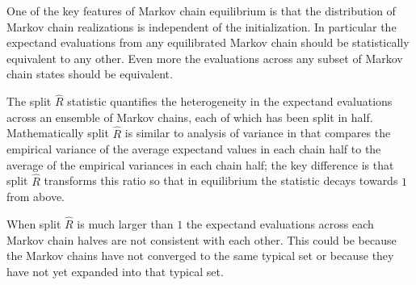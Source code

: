 \documentclass[
  letterpaper,
  DIV=11,
  numbers=noendperiod]{scrartcl}
\begin{document}
One of the key features of Markov chain equilibrium is that the
distribution of Markov chain realizations is independent of the
initialization. In particular the expectand evaluations from any
equilibrated Markov chain should be statistically equivalent to any
other. Even more the evaluations across any subset of Markov chain
states should be equivalent.

The split \(\hat{R}\) statistic quantifies the heterogeneity in the
expectand evaluations across an ensemble of Markov chains, each of which
has been split in half. Mathematically split \(\hat{R}\) is similar to
analysis of variance in that compares the empirical variance of the
average expectand values in each chain half to the average of the
empirical variances in each chain half; the key difference is that split
\(\hat{R}\) transforms this ratio so that in equilibrium the statistic
decays towards \(1\) from above.

When split \(\hat{R}\) is much larger than \(1\) the expectand
evaluations across each Markov chain halves are not consistent with each
other. This could be because the Markov chains have not converged to the
same typical set or because they have not yet expanded into that typical
set.
\end{document}
